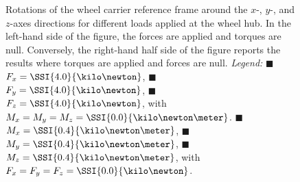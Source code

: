 \begin{figure}[htb]
  \centering
  \small{}
  \caption{Rotations of the wheel carrier reference frame around the $x$-, $y$-, and $z$-axes directions for different loads applied at the wheel hub. In the left-hand side of the figure, the forces are applied and torques are null. Conversely, the right-hand half side of the figure reports the results where torques are applied and forces are null. \emph{Legend:} {\color{mycolor1}$\blacksquare$}~$F_x = \SSI{4.0}{\kilo\newton}$, {\color{mycolor2}$\blacksquare$}~$F_y = \SSI{4.0}{\kilo\newton}$, {\color{mycolor3}$\blacksquare$}~$F_z = \SSI{4.0}{\kilo\newton}$, with $M_x = M_y = M_z = \SSI{0.0}{\kilo\newton\meter}$. {\color{mycolor4}$\blacksquare$}~$M_x = \SSI{0.4}{\kilo\newton\meter}$, {\color{mycolor5}$\blacksquare$}~$M_y = \SSI{0.4}{\kilo\newton\meter}$, {\color{mycolor6}$\blacksquare$}~$M_z = \SSI{0.4}{\kilo\newton\meter}$, with $F_x = F_y = F_z = \SSI{0.0}{\kilo\newton}$.}
  \label{app4:fig:rotations}
\end{figure}

